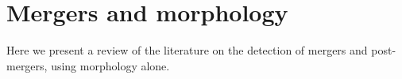 \section{Mergers and morphology}
Here we present a review of the literature on the detection of mergers and post-mergers, using morphology alone.


